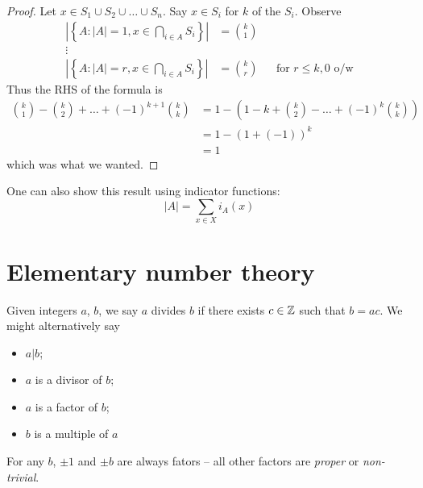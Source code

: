 \documentclass{../../template/note}
\begin{document}
    \begin{proof}
        Let \(x \in S_1 \cup S_2 \cup \dots \cup S_n\). Say \(x \in S_i\) for \(k\) of the \(S_i\). Observe
        \begin{align*}
            \left|\left\{A : |A| = 1, x \in \bigcap_{i \in A} S_i\right\}\right| &= \binom k 1 \\
            \vdots \\
            \left|\left\{A : |A| = r, x \in \bigcap_{i \in A} S_i\right\}\right| &= \binom k r && \text{for } r \leq k, 0 \text{ o/w}
        \end{align*}
        Thus the RHS of the formula is
        \begin{align*}
            \binom k 1 - \binom k 2 + \dots + (-1)^{k+1} \binom{k}{k} &= 1 - \left(1 - k + \binom k 2 - \dots + (-1)^k \binom k k\right) \\
            &= 1 - (1 + (-1))^k \\
            &= 1
        \end{align*}
        which was what we wanted.       
    \end{proof}
    
    \begin{remark*}
        One can also show this result using indicator functions:
        \[
            |A| = \sum_{x \in X} i_A(x)
        \]
    \end{remark*}
    
    \section{Elementary number theory}

    \begin{definition}
        Given integers \(a\), \(b\), we say \(a\) divides \(b\) if there exists \(c \in \mathbb Z\) such that \(b = ac\). We might alternatively say
        \begin{itemize}
            \item \(a | b\);
            \item \(a\) is a divisor of \(b\);
            \item \(a\) is a factor of \(b\);
            \item \(b\) is a multiple of \(a\)
        \end{itemize}
        For any \(b\), \(\pm 1\) and \(\pm b\) are always fators -- all other factors are \emph{proper} or \emph{non-trivial}.
    \end{definition}
    
\end{document}
